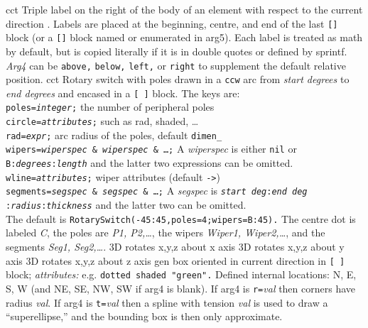   {cct}%
  {Triple label on the right of the body of an element with respect to the
    current direction .  Labels are placed at the
    beginning, centre, and end of the last {\tt []} block (or a {\tt []} block
    named or enumerated in arg5). Each label is treated as math by
    default, but is copied literally if it is in double quotes or defined
    by sprintf.  {\sl Arg4} can be {\tt above,} {\tt below,} {\tt left,}
    or {\tt right} to supplement the default relative position.}%
%
  {cct}%
  { Rotary switch with poles drawn in a {\tt ccw} arc from {\sl start degrees}
    to {\sl end degrees} and encased in a {\tt [ ]} block.
    The keys are:\\
    {\tt poles={\sl integer};} the number of peripheral poles\\
    {\tt circle={\sl attributes};} such as rad, shaded, \ldots\\
    {\tt rad={\sl expr};} arc radius of the poles, default {\tt dimen\_}\\
    {\tt wipers={\sl wiperspec} \& {\sl wiperspec} \& \ldots;}
     A {\sl wiperspec} is either {\tt nil} or {\tt B:{\sl degrees}:{\sl length}}
     and the latter two expressions can be omitted.\\
    {\tt wline={\sl attributes};} wiper attributes (default {\tt ->})\\
    {\tt segments={\sl segspec} \& {\sl segspec} \& \ldots;}
     A {\sl segspec} is {\tt {\sl start deg}:{\sl end deg}
     :{\sl radius}:{\sl thickness}} and the latter two can be omitted.\\
    The default is {\tt RotarySwitch(-45:45,poles=4;wipers=B:45).}
    The centre dot is labeled {\sl C}, the poles are {\sl P1, P2,\ldots},
    the wipers {\sl Wiper1, Wiper2,\ldots}, and the segments
    {\sl Seg1, Seg2,\ldots}.}%
%
  {3D} {rotates x,y,z about x axis}%
%
  {3D} {rotates x,y,z about y axis}%
%
  {3D} {rotates x,y,z about z axis}%
%
  {gen}%
  {box oriented in current direction in {\tt [ ]} block;
   {\sl attributes:} e.g. {\tt dotted shaded "green".}  Defined internal
   locations: N, E, S, W (and NE, SE, NW, SW if arg4 is blank).  If arg4
   is {\tt r=}{\sl val} then corners have radius {\sl val}.  If arg4 is
   {\tt t=}{\sl val} then a spline with tension {\sl val} is used to draw
   a ``superellipse,'' and the bounding box is then only approximate. }%
